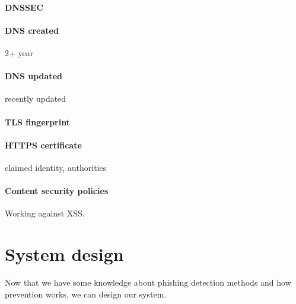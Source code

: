 \documentclass[
  digital, %
  oneside, %
  table,   %
  nolof,     %
  nolot,     %
]{fithesis3}
\begin{document}
\subsubsection{DNSSEC}

\subsubsection{DNS created} 2+ year
\subsubsection{DNS updated} recently updated
\subsubsection{TLS fingerprint}
\subsubsection{HTTPS certificate} claimed identity, authorities
\subsubsection{Content security policies} Working against XSS.


\chapter{System design}

Now that we have some knowledge about phishing detection methods and how prevention works, we can design our system. 
\end{document}
